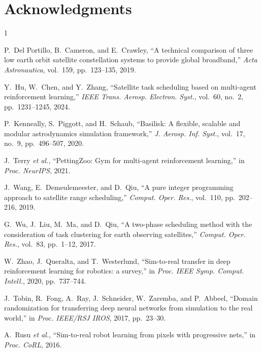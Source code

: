 \documentclass[conference]{IEEEtran}
\begin{document}
\section*{Acknowledgments}


\begin{thebibliography}{1}

P.~Del Portillo, B.~Cameron, and E.~Crawley, ``A technical comparison of three low earth orbit satellite constellation systems to provide global broadband,'' \textit{Acta Astronautica}, vol.~159, pp.~123--135, 2019.

Y.~Hu, W.~Chen, and Y.~Zhang, ``Satellite task scheduling based on multi-agent reinforcement learning,'' \textit{IEEE Trans. Aerosp. Electron. Syst.}, vol.~60, no.~2, pp.~1231--1245, 2024.

P.~Kenneally, S.~Piggott, and H.~Schaub, ``Basilisk: A flexible, scalable and modular astrodynamics simulation framework,'' \textit{J. Aerosp. Inf. Syst.}, vol.~17, no.~9, pp.~496--507, 2020.

J.~Terry \textit{et al.}, ``PettingZoo: Gym for multi-agent reinforcement learning,'' in \textit{Proc. NeurIPS}, 2021.

J.~Wang, E.~Demeulemeester, and D.~Qiu, ``A pure integer programming approach to satellite range scheduling,'' \textit{Comput. Oper. Res.}, vol.~110, pp.~202--216, 2019.

G.~Wu, J.~Liu, M.~Ma, and D.~Qiu, ``A two-phase scheduling method with the consideration of task clustering for earth observing satellites,'' \textit{Comput. Oper. Res.}, vol.~83, pp.~1--12, 2017.

W.~Zhao, J.~Queralta, and T.~Westerlund, ``Sim-to-real transfer in deep reinforcement learning for robotics: a survey,'' in \textit{Proc. IEEE Symp. Comput. Intell.}, 2020, pp.~737--744.

J.~Tobin, R.~Fong, A.~Ray, J.~Schneider, W.~Zaremba, and P.~Abbeel, ``Domain randomization for transferring deep neural networks from simulation to the real world,'' in \textit{Proc. IEEE/RSJ IROS}, 2017, pp.~23--30.

A.~Rusu \textit{et al.}, ``Sim-to-real robot learning from pixels with progressive nets,'' in \textit{Proc. CoRL}, 2016.


\end{thebibliography}
\end{document}
